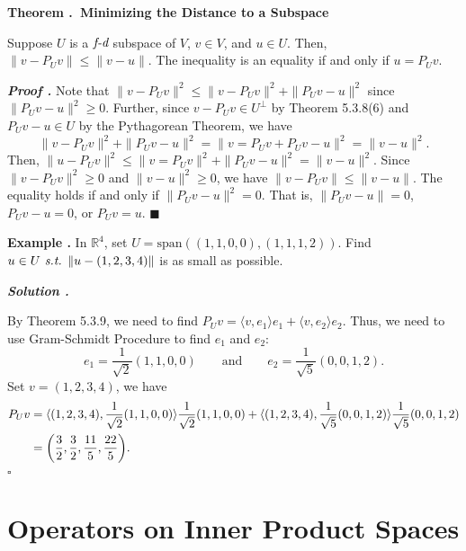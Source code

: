 \documentclass[11pt, letterpaper]{article}
\newcounter{index}[subsection]
\newenvironment*{eg}{\begin{framed}\par\noindent\textbf{Example \thesubsection.\stepcounter{index}\theindex}}{\par\end{framed}}
\newenvironment*{thm}[1]{\begin{tcolorbox}\par\noindent\textbf{Theorem \thesubsection.\stepcounter{index}\theindex\ #1} \par}{\par\end{tcolorbox}}
\newcounter{nprf}[subsection]
\newenvironment*{prf}{\par\indent\textbf{\textit{Proof \stepcounter{nprf}\thenprf.}}}{\hfill$\blacksquare$\par}
\newenvironment*{sol}{\par\indent\textbf{\textit{Solution \stepcounter{nprf}\thenprf.}}\par}{\hfill{$\square$}\par}
\def\R{\mathbb{R}}
\def\st{\emph{ s.t. }}
\def\FD{\emph{f-d}}
\def\span{\mathrm{span}}
\begin{document}
\begin{thm}{Minimizing the Distance to a Subspace}
	Suppose $U$ is a $\FD$ subspace of $V$, $v\in V$, and $u\in U$. Then, $\|v-P_Uv\|\leq\|v-u\|$. The inequality is an equality if and only if $u=P_Uv$.
\end{thm}
\begin{prf}
	Note that $\|v-P_Uv\|^2\leq\|v-P_Uv\|^2+\|P_Uv-u\|^2$ since $\|P_Uv-u\|^2\geq0$. Further, since $v-P_Uv\in U^\perp$ by Theorem 5.3.8(6) and $P_Uv-u\in U$ by the Pythagorean Theorem, we have \[\|v-P_Uv\|^2+\|P_Uv-u\|^2=\|v=P_Uv+P_Uv-u\|^2=\|v-u\|^2.\] Then, $\|u-P_Uv\|^2\leq\|v=P_Uv\|^2+\|P_Uv-u\|^2=\|v-u\|^2$. Since $\|v-P_Uv\|^2\geq0$ and $\|v-u\|^2\geq0$, we have $\|v-P_Uv\|\leq\|v-u\|$. The equality holds if and only  if $\|P_Uv-u\|^2=0$. That is, $\|P_Uv-u\|=0$, $P_Uv-u=0$, or $P_Uv=u$.
\end{prf}
\begin{eg}{}
	In $\R^4$, set $U=\span((1,1,0,0),(1,1,1,2))$. Find $u\in U\st\|u-(1,2,3,4)\|$ is as small as possible.
	\begin{sol}
		By Theorem 5.3.9, we need to find $P_Uv=\langle v,e_1\rangle e_1+\langle v,e_2\rangle e_2$. Thus, we need to use Gram-Schmidt Procedure to find $e_1$ and $e_2$: \[e_1=\dfrac{1}{\sqrt{2}}(1,1,0,0)\qquad\text{and}\qquad e_2=\dfrac{1}{\sqrt{5}}(0,0,1,2).\] Set $v=(1,2,3,4)$, we have \[\begin{aligned}P_Uv&=\langle(1,2,3,4),\dfrac{1}{\sqrt{2}}(1,1,0,0)\rangle\dfrac{1}{\sqrt{2}}(1,1,0,0)+\langle(1,2,3,4),\dfrac{1}{\sqrt{5}}(0,0,1,2)\rangle\dfrac{1}{\sqrt{5}}(0,0,1,2)\\&=\qty(\dfrac{3}{2},\dfrac{3}{2},\dfrac{11}{5},\dfrac{22}{5}).\end{aligned}\]	
	\end{sol}
	
\end{eg}


\newpage
\section{Operators on Inner Product Spaces}
\end{document}
